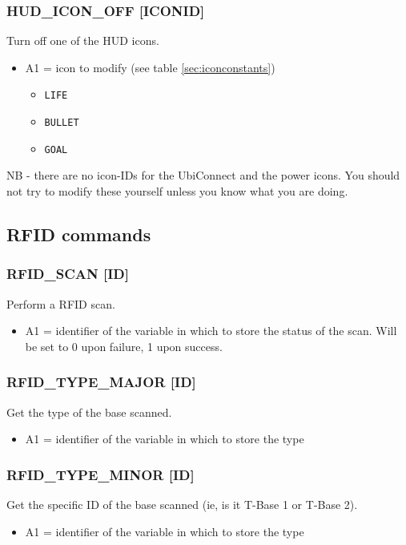 \documentclass[12pt,a4paper]{scrbook}
\begin{document}
\subsubsection{HUD\_ICON\_OFF [ICONID]}
Turn off one of the HUD icons.
\begin{itemize}
\item A1 = icon to modify (see table \ref{sec:iconconstants})
\begin{itemize}
\item \texttt{LIFE}
\item \texttt{BULLET}
\item \texttt{GOAL}
\end{itemize}
\end{itemize}
NB - there are no icon-IDs for the UbiConnect and the power icons.  You should not try to 
modify these yourself unless you know what you are doing.

\subsection{RFID commands}

\subsubsection{RFID\_SCAN [ID]}
Perform a RFID scan.
\begin{itemize}
\item A1 = identifier of the variable in which to store the status of the scan.  Will be set to 0 
		upon failure, 1 upon success.
\end{itemize}

\subsubsection{RFID\_TYPE\_MAJOR [ID]}
Get the type of the base scanned.
\begin{itemize}
\item A1 = identifier of the variable in which to store the type
\end{itemize}

\subsubsection{RFID\_TYPE\_MINOR [ID]}
Get the specific ID of the base scanned (ie, is it T-Base 1 or T-Base 2).
\begin{itemize}
\item A1 = identifier of the variable in which to store the type
\end{itemize}
\end{document}
